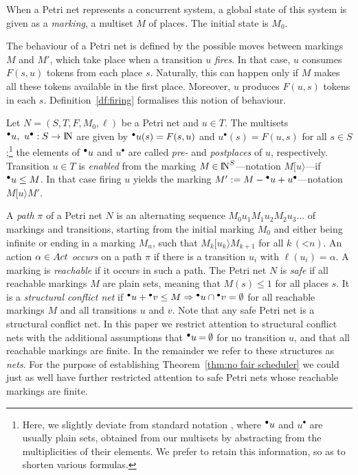 \documentclass[smallcondensed]{svjour3}
\def\postcond#1{{#1}^\bullet}
\newcommand{\Thm}[1]{Theorem~\ref{thm:#1}}
\newcommand{\Def}[1]{Definition~\ref{df:#1}}
\begin{document}
\noindent
When a Petri net represents a concurrent
system, a global state of this system is given as a \emph{marking},
a multiset $M$ of places. 
The initial state is $M_0$.

The behaviour of a Petri net is defined by the possible moves between
markings $M$ and $M'$, which take place when a transition $u$ \emph{fires}.  In that case,
$u$ consumes $F(s,u)$ tokens from each 
place $s$.  Naturally, this can happen only if $M$ makes all these
tokens available in the first place.  Moreover, $u$ produces $F(u,s)$ tokens
in each $s$.  \Def{firing} formalises this notion of behaviour.

\begin{definition}\label{df:firing}
Let $N = (S, T, F, M_0, \ell)$ be a Petri net and $u\mathbin\in T$.
The multisets $\precond{u},~\postcond{u}: S \rightarrow
\NN$ are given by $\precond{u}(s)=F(s,u)$ and
$\postcond{u}(s)=F(u,s)$ for all $s \mathbin\in S$;\footnote{Here, we slightly deviate from
  standard notation \cite{Re85}, where $\precond{u}$ and $\postcond{u}$ are usually plain sets,
obtained from our multisets by abstracting from the multiplicities of their elements. 
We prefer to retain this information, so as to shorten various formulas.}
the elements of $\precond{u}$ and $\postcond{u}$ are
called \emph{pre-} and \emph{postplaces} of $u$, respectively.
Transition $u\mathbin\in T$ is \emph{enabled} from the marking $M\mathbin\in\mathop{\rm I\mkern-2.5mu N}\nolimits ^S$---notation
$M[u\rangle$---if $\precond{u} \leq M$.
In that case firing $u$ yields the marking 
$M':=M-\precond{u}+\postcond{u}$\linebreak[3]---notation $M[u\rangle M'$.
\end{definition}
A \emph{path} $\pi$ of a Petri net $N$ is an alternating sequence $M_0 u_1 M_1 u_2 M_2 u_3 \dots$ of markings and
transitions, starting from the initial marking $M_0$ and either being infinite or ending in a
marking $M_n$, such that $M_k [u_k\rangle M_{k+1}$ for all $k \,(\mathord< n)$.
An action $\alpha\in Act$ \emph{occurs} on a path $\pi$ if there is a transition $u_i$ with $\ell(u_i)=\alpha$.
A marking is \emph{reachable} if it occurs in such a path.
The Petri net $N$ is
\emph{safe} if all reachable markings $M$ are plain sets, meaning that $M(s)\leq 1$ for all places $s$.
It is a \emph{structural conflict net} \cite{GGS11} if $\precond{u}+\precond{v}\leq M \Rightarrow
\precond{u}\cap\precond{v}=\emptyset$ for all reachable markings $M$ and all transitions $u$ and $v$.
Note that any safe Petri net is a structural conflict net.
In this paper we restrict attention to structural conflict nets with the additional assumptions that $\precond{u}\mathbin=\emptyset$ for no transition $u$, 
and that all reachable markings are finite.
In the remainder we refer
to these structures as \emph{nets}. For the purpose of establishing \Thm{no fair scheduler} we could
just as well have further restricted attention to
safe Petri nets whose reachable markings are finite.
\end{document}

